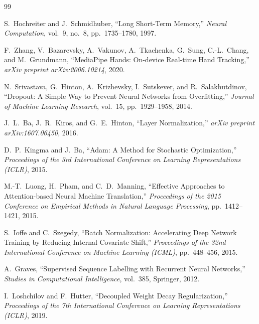 \documentclass[12pt, a4paper]{article}
\begin{document}
\begin{thebibliography}{99}

S.~Hochreiter and J.~Schmidhuber,
``Long Short-Term Memory,''
\textit{Neural Computation}, vol.~9, no.~8, pp.~1735--1780, 1997.

F.~Zhang, V.~Bazarevsky, A.~Vakunov, A.~Tkachenka, G.~Sung, C.-L.~Chang, and M.~Grundmann,
``MediaPipe Hands: On-device Real-time Hand Tracking,''
\textit{arXiv preprint arXiv:2006.10214}, 2020.

N.~Srivastava, G.~Hinton, A.~Krizhevsky, I.~Sutskever, and R.~Salakhutdinov,
``Dropout: A Simple Way to Prevent Neural Networks from Overfitting,''
\textit{Journal of Machine Learning Research}, vol.~15, pp.~1929--1958, 2014.

J.~L.~Ba, J.~R.~Kiros, and G.~E.~Hinton,
``Layer Normalization,''
\textit{arXiv preprint arXiv:1607.06450}, 2016.

D.~P.~Kingma and J.~Ba,
``Adam: A Method for Stochastic Optimization,''
\textit{Proceedings of the 3rd International Conference on Learning Representations (ICLR)}, 2015.

M.-T.~Luong, H.~Pham, and C.~D.~Manning,
``Effective Approaches to Attention-based Neural Machine Translation,''
\textit{Proceedings of the 2015 Conference on Empirical Methods in Natural Language Processing}, pp.~1412--1421, 2015.

S.~Ioffe and C.~Szegedy,
``Batch Normalization: Accelerating Deep Network Training by Reducing Internal Covariate Shift,''
\textit{Proceedings of the 32nd International Conference on Machine Learning (ICML)}, pp.~448--456, 2015.

A.~Graves,
``Supervised Sequence Labelling with Recurrent Neural Networks,''
\textit{Studies in Computational Intelligence}, vol.~385, Springer, 2012.

I.~Loshchilov and F.~Hutter,
``Decoupled Weight Decay Regularization,''
\textit{Proceedings of the 7th International Conference on Learning Representations (ICLR)}, 2019.

\end{thebibliography}
\end{document}
